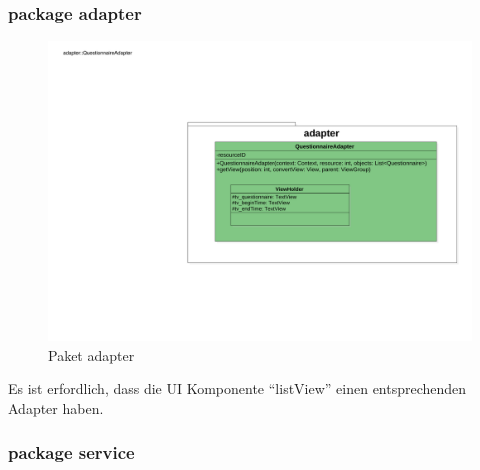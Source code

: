 \documentclass[a4paper]{scrreprt}
\begin{document}
                \subsubsection{package adapter}

                    \begin{figure}[H]
                        \centering
                        \includegraphics[scale = 0.8]{adpater.pdf}
                        \caption{Paket adapter}
                    \end{figure}

                    Es ist erfordlich, dass die UI Komponente ``listView'' einen entsprechenden Adapter haben.

                \subsubsection{package service}
\end{document}
